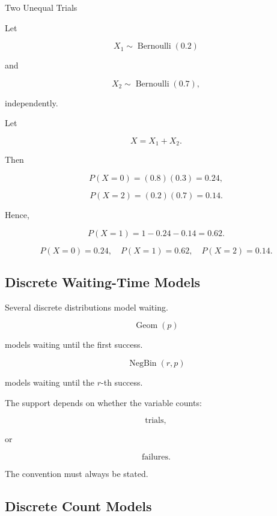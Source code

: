 \begin{workedexamplebox}{Two Unequal Trials}

Let

\[
X_1\sim\operatorname{Bernoulli}(0.2)
\]

and

\[
X_2\sim\operatorname{Bernoulli}(0.7),
\]

independently.

Let

\[
X=X_1+X_2.
\]

Then

\[
P(X=0)
=
(0.8)(0.3)
=
0.24,
\]

\[
P(X=2)
=
(0.2)(0.7)
=
0.14.
\]

Hence,

\[
P(X=1)
=
1-0.24-0.14
=
0.62.
\]

\begin{answerbox}
\[
\boxed{
P(X=0)=0.24,\quad
P(X=1)=0.62,\quad
P(X=2)=0.14.
}
\]
\end{answerbox}

\end{workedexamplebox}

\subsection{Discrete Waiting-Time Models}
\label{subsec:discrete-waiting-time-models}

Several discrete distributions model waiting.

\[
\boxed{
\operatorname{Geom}(p)
}
\]

models waiting until the first success.

\[
\boxed{
\operatorname{NegBin}(r,p)
}
\]

models waiting until the \(r\)-th success.

The support depends on whether the variable counts:

\[
\text{trials},
\]

or

\[
\text{failures}.
\]

The convention must always be stated.

\subsection{Discrete Count Models}
\label{subsec:discrete-count-models}

